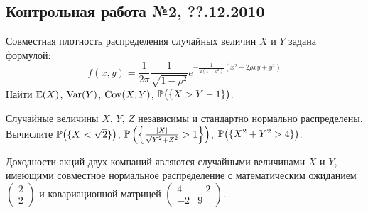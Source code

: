 \documentclass[12pt, a4paper]{article}\usepackage[]{graphicx}\usepackage[]{color}
\newenvironment{enumerate*}{
	\begin{enumerate}
		\setlength{\itemsep}{0pt}
		\setlength{\parskip}{0pt}
		\setlength{\parsep}{0pt}
	}{\end{enumerate}}
\newcommand{\ofbr}[1]{\bigl( \{ #1 \} \bigr)}     %
\begin{document}
	\subsection{Контрольная работа №2, ??.12.2010}
	\begin{enumerate*}
		\item Совместная плотность распределения случайных величин $X$ и $Y$ задана формулой:
		\[
		f(x,y)=\frac{1}{2\pi}\frac{1}{\sqrt{1-\rho^2}}e^{-\frac{1}{2(1-\rho^2)}\left(x^2-2\rho xy+y^2\right)}
		\]
		Найти $\E(X)$, $\Var(Y)$, $\Cov(X,Y)$, $\P\ofbr{X>Y-1}$.
		\item Случайные величины $X$, $Y$, $Z$ независимы и стандартно нормально распределены. Вычислите
		$\P\ofbr{X<\sqrt2}$, $\P\left(\left\{ \frac{|X|}{\sqrt{Y^2+Z^2}}>1\right\}\right)$, $\P\ofbr{X^2+Y^2>4}$.
		\item Доходности акций двух компаний являются случайными величинами $X$ и $Y$, имеющими совместное нормальное распределение с математическим ожиданием $\left( \begin{array}{c}2\\2\end{array}\right)$ и ковариационной матрицей $\left( \begin{array}{cc}4 & -2\\-2 & 9\end{array}\right)$.


\end{enumerate*}
\end{document}
